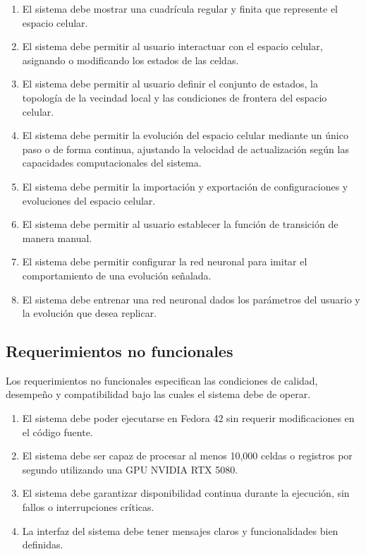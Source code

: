 \begin{enumerate}[label=RF\arabic*.]
	\item El sistema debe mostrar una cuadrícula regular y finita que represente el espacio celular.
	\item El sistema debe permitir al usuario interactuar con el espacio celular, asignando o modificando los estados de las celdas.
	\item El sistema debe permitir al usuario definir el conjunto de estados, la topología de la vecindad local y las condiciones de frontera del espacio celular.
	\item El sistema debe permitir la evolución del espacio celular mediante un único paso o de forma continua, ajustando la velocidad de actualización según las capacidades computacionales del sistema.
	\item El sistema debe permitir la importación y exportación de configuraciones y evoluciones del espacio celular.
	\item El sistema debe permitir al usuario establecer la función de transición de manera manual.
	\item El sistema debe permitir configurar la red neuronal para imitar el comportamiento de una evolución señalada.
	\item El sistema debe entrenar una red neuronal dados los parámetros del usuario y la evolución que desea replicar.
\end{enumerate}

\subsection{Requerimientos no funcionales}

Los requerimientos no funcionales especifican las condiciones de calidad, desempeño y compatibilidad bajo las cuales el sistema debe de operar.

\begin{enumerate}[label=RNF\arabic*.]
	\item El sistema debe poder ejecutarse en Fedora 42 sin requerir modificaciones en el código fuente.
	\item El sistema debe ser capaz de procesar al menos 10,000 celdas o registros por segundo utilizando una GPU NVIDIA RTX 5080.
	\item El sistema debe garantizar disponibilidad continua durante la ejecución, sin fallos o interrupciones críticas.
	\item La interfaz del sistema debe tener mensajes claros y funcionalidades bien definidas.
\end{enumerate}

